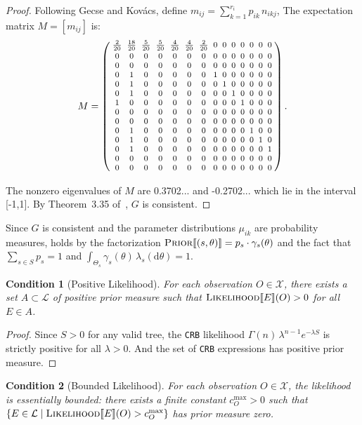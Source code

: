 \documentclass[11pt,a4paper]{article}
\newtheorem{condition}[condition]{Condition}
\newcommand{\LL}{\mathcal{L}}
\newcommand{\XX}{\mathcal{X}}
\newcommand{\Prior}{\textsc{Prior}}
\newcommand{\Likelihood}{\textsc{Likelihood}}
\newcommand{\sem}[1]{\llbracket #1 \rrbracket}
\begin{document}
\begin{proof}
Following Gecse and Kov{\'a}cs, define
$m_{ij} = \sum_{k=1}^{r_i} p_{ik}\, n_{ikj}$,
The expectation matrix $M = [m_{ij}]$ is:
\begin{equation}\label{eq:expectation-matrix}
\setlength{\arraycolsep}{2.5pt}
\footnotesize
M = \left(\begin{array}{cccccccccccccc}
\frac{2}{20} & \frac{18}{20} & \frac{5}{20} & \frac{5}{20} & \frac{4}{20} & \frac{4}{20} & \frac{2}{20} & 0 & 0 & 0 & 0 & 0 & 0 & 0 \\[2pt]
0&0&0&0&0&0&0&0&0&0&0&0&0&0\\
0&0&0&0&0&0&0&0&0&0&0&0&0&0\\
0&1&0&0&0&0&0&1&0&0&0&0&0&0\\
0&1&0&0&0&0&0&0&1&0&0&0&0&0\\
0&1&0&0&0&0&0&0&0&1&0&0&0&0\\
1&0&0&0&0&0&0&0&0&0&1&0&0&0\\
0&0&0&0&0&0&0&0&0&0&0&0&0&0\\
0&0&0&0&0&0&0&0&0&0&0&0&0&0\\
0&1&0&0&0&0&0&0&0&0&0&1&0&0\\
0&1&0&0&0&0&0&0&0&0&0&0&1&0\\
0&1&0&0&0&0&0&0&0&0&0&0&0&1\\
0&0&0&0&0&0&0&0&0&0&0&0&0&0\\
0&0&0&0&0&0&0&0&0&0&0&0&0&0
\end{array}\right).
\end{equation}

The nonzero eigenvalues of $M$ are 0.3702... and -0.2702... which lie in the interval [-1,1].
By Theorem~3.35 of~\cite{saad2023}, $G$ is
consistent.
\end{proof}
Since $G$ is consistent and the parameter distributions $\mu_{ik}$ are
probability measures,  holds by the factorization
$\Prior\sem{(s,\theta)} = p_s \cdot \gamma_s(\theta)$ and the fact that
$\sum_{s \in S} p_s = 1$ and
$\int_{\Theta_s} \gamma_s(\theta)\,\lambda_s(\mathrm{d}\theta) = 1$.


\begin{condition}[Positive Likelihood]\label{cond:pos-lik}
For each observation $O \in \XX$, there exists a set $A \subset \LL$ of
positive prior measure such that $\Likelihood\sem{E}(O) > 0$ for all
$E \in A$.
\end{condition}

\begin{proof}
Since $S > 0$ for any valid tree, the \texttt{CRB} likelihood
$\Gamma(n)\,\lambda^{n-1} e^{-\lambda S}$ is strictly positive for all
$\lambda > 0$.  And the set of \texttt{CRB} expressions has positive prior
measure.
\end{proof}
\begin{condition}[Bounded Likelihood]\label{cond:bdd-lik}
For each observation $O \in \XX$, the likelihood is essentially bounded:
there exists a finite constant $c^{\max}_{O} > 0$ such that
$\{E \in \LL \mid \Likelihood\sem{E}(O) > c^{\max}_{O}\}$ has
prior measure zero.
\end{condition}
\end{document}
